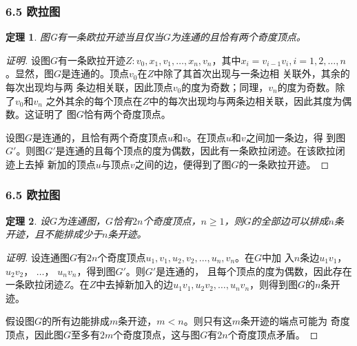 \documentclass{beamer}
\newtheorem{Thm}{定理}[section]
\theoremstyle{definition}
\theoremstyle{example}
\begin{document}
\begin{CJK*}{UTF8}{gbsn}
\begin{frame}
\end{frame}

\begin{frame}
  \frametitle{6.5 欧拉图}
  \begin{Thm}
    图G有一条欧拉开迹当且仅当$G$为连通的且恰有两个奇度顶点。
  \end{Thm}
  \begin{proof}[证明]
      设图$G$有一条欧拉开迹$Z:v_0,x_1,v_1,\ldots, x_n,v_n$，其中$x_i=v_{i-1}v_i, i =
  1,2,\ldots, n$。显然，图$G$是连通的。顶点$v_0$在$Z$中除了其首次出现与一条边相
  关联外，其余的每次出现均与两
  条边相关联，因此顶点$v_0$的度为奇数；同理，$v_n$的度为奇数。除了$v_0$和$v_n$
  之外其余的每个顶点在$Z$中的每次出现均与两条边相关联，因此其度为偶数。这证明了
  图$G$恰有两个奇度顶点。

  设图$G$是连通的，且恰有两个奇度顶点$u$和$v$。在顶点$u$和$v$之间加一条边，得
  到图$G'$。则图$G'$是连通的且每个顶点的度为偶数，因此有一条欧拉闭迹。在该欧拉闭迹上去掉
  新加的顶点$u$与顶点$v$之间的边，便得到了图$G$的一条欧拉开迹。
  \end{proof}
\end{frame}


\begin{frame}
  \frametitle{6.5 欧拉图}
  \begin{Thm}
    设$G$为连通图，$G$恰有$2n$个奇度顶点，$n \geq 1$，则$G$的全部边可以排成$n$条
    开迹，且不能排成少于$n$条开迹。  \end{Thm}
  \begin{proof}[证明]
      设连通图$G$有$2n$个奇度顶点$u_1,v_1,u_2,v_2,\ldots,u_n,v_n$。在$G$中加
  入$n$条边$u_1v_1$，　$u_2v_2$， $\ldots$， $u_nv_n$，得到图$G'$。则$G'$是连通的，
  且每个顶点的度为偶数，因此存在一条欧拉闭迹$Z$。在$Z$中去掉新加入的边$u_1v_1,
  u_2v_2, \ldots, u_nv_n$，则得到图$G$的$n$条开迹。

  假设图$G$的所有边能排成$m$条开迹，$m < n$。则只有这$m$条开迹的端点可能为
  奇度顶点，因此图$G$至多有$2m$个奇度顶点，这与图$G$有$2n$个奇度顶点矛盾。
  \end{proof}
\end{frame}


\end{CJK*}
\end{document}
